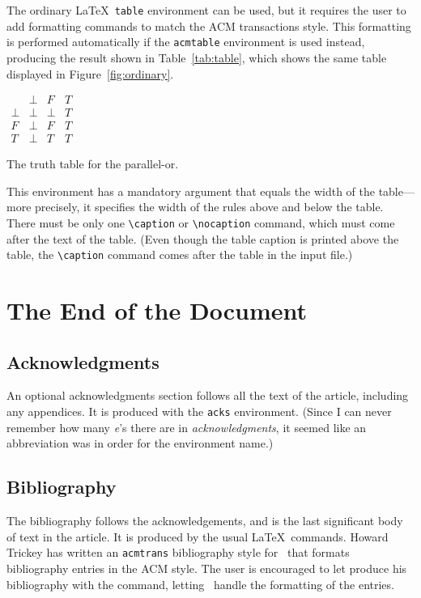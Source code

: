 The ordinary \LaTeX\ {\tt table} environment can be used, but it
requires the user to add formatting commands to match the ACM
transactions style.  This formatting is performed automatically
if the {\tt acmtable} environment is used instead, producing
the result shown in Table~\ref{tab:table}, which shows the same
table displayed in Figure~\ref{fig:ordinary}.
\begin{acmtable}{100pt}
\centering
\(\begin{array}{c|ccc}
     & \bot & F & T \\
\hline
\bot & \bot & \bot & T \\
F    & \bot & F    & T \\
T    & \bot & T    & T
\end{array}\)
\caption{The truth table for the parallel-or.}
\label{tab:table}
\end{acmtable}
This environment has a mandatory argument that equals the width
of the table---more precisely, it specifies the width of the rules
above and below the table.  There must be only one 
\verb|\caption| or \verb|\nocaption|
command, which must come after the text of the table.  
(Even though the table caption is printed above the table, the
\verb|\caption| command comes after the table in the input file.)


\section{The End of the Document}

\subsection{Acknowledgments}

An optional acknowledgments section follows all the text of the
article, including any appendices.  It is produced with the
{\tt acks} environment.  (Since I can never remember how many
{\em e\/}'s there are in {\em acknowledgments}, it seemed
like an abbreviation was in order for the environment name.)


\subsection{Bibliography}

The bibliography follows the acknowledgements, and is the last
significant body of text in the article.  It is produced by the usual
\LaTeX\ commands.  Howard Trickey has written an {\tt acmtrans}
bibliography style for \BibTeX\ that formats bibliography entries in
the ACM style.  The user is encouraged to let produce his bibliography
with the \verb|| command, letting \BibTeX\ handle the
formatting of the entries.


